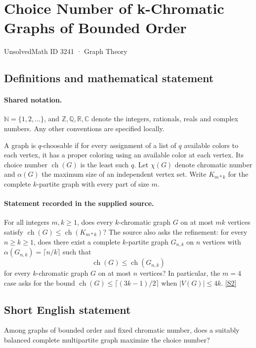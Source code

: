 \documentclass[11pt]{article}
\newcommand{\sref}[2]{\hyperlink{source:#1:#2}{[S#2]}}
\begin{document}
\setcounter{section}{3240}
\section{Choice Number of k-Chromatic Graphs of Bounded Order}\label{3241}
{\small\sffamily UnsolvedMath ID 3241 · Graph Theory}
\subsection{Definitions and mathematical statement}

\paragraph{Shared notation.}$\mathbb N=\{1,2,\ldots\}$, and $\mathbb Z,\mathbb Q,\mathbb R,\mathbb C$ denote the integers, rationals, reals and complex numbers. Any other conventions are specified locally.


A graph is $q$-choosable if for every assignment of a list of $q$ available colors to each vertex, it has a proper coloring using an available color at each vertex. Its choice number $\operatorname{ch}(G)$ is the least such $q$. Let $\chi(G)$ denote chromatic number and $\alpha(G)$ the maximum size of an independent vertex set. Write $K_{m*k}$ for the complete $k$-partite graph with every part of size $m$.
\paragraph{Statement recorded in the supplied source.}
For all integers $m,k\ge1$, does every $k$-chromatic graph $G$ on at most $mk$ vertices satisfy $\operatorname{ch}(G)\le\operatorname{ch}(K_{m*k})$? The source also asks the refinement: for every $n\ge k\ge1$, does there exist a complete $k$-partite graph $G_{n,k}$ on $n$ vertices with $\alpha(G_{n,k})=\lceil n/k\rceil$ such that \[\operatorname{ch}(G)\le\operatorname{ch}(G_{n,k})\] for every $k$-chromatic graph $G$ on at most $n$ vertices? In particular, the $m=4$ case asks for the bound $\operatorname{ch}(G)\le\lceil(3k-1)/2\rceil$ when $|V(G)|\le4k$. \sref{3241}{2}
\subsection{Short English statement}
Among graphs of bounded order and fixed chromatic number, does a suitably balanced complete multipartite graph maximize the choice number?
\end{document}
